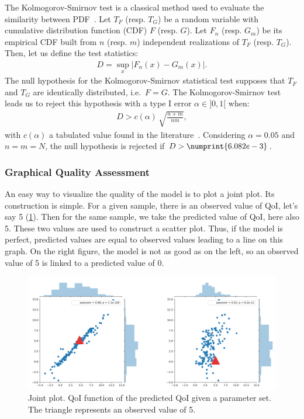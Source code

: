The Kolmogorov-Smirnov test is a classical method used to evaluate the similarity between PDF~\citep{clarke1992}. Let $T_F$ (resp. $T_G$) be a random variable with cumulative distribution function (CDF) $F$ (resp. $G$). Let $F_n$ (resp. $G_m$) be its empirical CDF built from $n$ (resp. $m$) independent realizations of $T_F$ (resp. $T_G$). Then, let us define the test statistics:
\begin{align}
D = \sup_{x} \lvert F_n(x) - G_m(x)\rvert.
\end{align}
The null hypothesis for the Kolmogorov-Smirnov statistical test supposes that $T_F$ and $T_G$ are identically distributed, i.e.~$F=G$. The Kolmogorov-Smirnov test leads us to reject this hypothesis with a type I error $\alpha\in]0,1[$ when:
\begin{align}
D > c(\alpha)\,\sqrt{\frac{n+m}{nm}}, \label{eq:nullhypothesis}
\end{align}
with $c(\alpha)$ a tabulated value found in the literature~\citep{smirnov1939}. Considering $\alpha = 0.05$ and $n = m = N$, the null hypothesis is rejected if $D > \numprint{6.082e-3}$.

\subsubsection{Graphical Quality Assessment}
An easy way to visualize the quality of the model is to plot a joint plot. Its construction is simple. For a given sample, there is an observed value of QoI, let's say 5 (\cref{fig:qq_plot}). Then for the same sample, we take the predicted value of QoI, here also 5. These two values are used to construct a scatter plot. Thus, if the model is perfect, predicted values are equal to observed values leading to a line on this graph. On the right figure, the model is not as good as on the left, so an observed value of 5 is linked to a predicted value of 0.

\begin{figure}[!h]
\centering
\includegraphics[width=0.9\linewidth,keepaspectratio]{fig/literature/qq_plot.png}
\caption{Joint plot. QoI function of the predicted QoI given a parameter set. The triangle represents an observed value of 5.}
\label{fig:qq_plot}
\end{figure}

